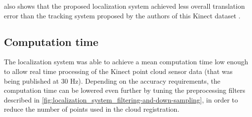 also shows that the proposed localization system achieved less overall translation error than the tracking system proposed by the authors of this Kinect dataset \cite{Pomerleau2011}.


\subsection{Computation time}

The localization system was able to achieve a mean computation time low enough to allow real time processing of the Kinect point cloud sensor data (that was being published at 30 Hz). Depending on the accuracy requirements, the computation time can be lowered even further by tuning the preprocessing filters described in \cref{fig:localization_system_filtering-and-down-sampling}, in order to reduce the number of points used in the cloud registration.
